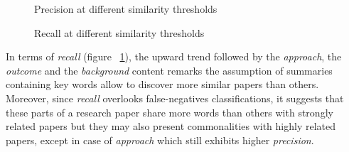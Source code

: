 \begin{figure}[!htb]\centering
   \begin{minipage}{0.49\textwidth}
     \caption{Precision at different similarity thresholds}\label{fig:precision}
   \end{minipage}
   \begin {minipage}[c]{0.49\textwidth}
     \caption{Recall at different similarity thresholds}\label{fig:recall}
   \end{minipage}
\end{figure}

In terms of \textit{recall} (figure ~\ref{fig:recall}), the upward trend followed by the \textit{approach}, the \textit{outcome} and the \textit{background} content remarks the assumption of summaries containing key words allow to discover more similar papers than others. Moreover, since \textit{recall} overlooks false-negatives classifications, it suggests that these parts of a research paper share more words than others with strongly related papers but they may also present commonalities with highly related papers, except in case of \textit{approach} which still exhibits higher \textit{precision}.

